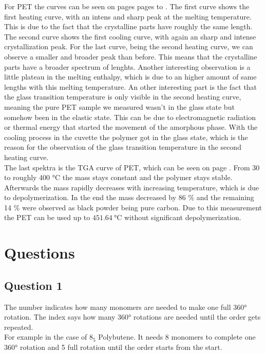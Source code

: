 \documentclass[10pt,a4paper,ngerman]{scrartcl}
\begin{document}
    For PET the curves can be seen on pages pages \pageref{pdf:pet-1hc} to \pageref{pdf:pet-2hc}. The first curve shows the first heating curve, with
    an intens and sharp peak at the melting temperature. This is due to the fact that the crystalline parts have roughly the same length.
    The second curve shows the first cooling curve, with again an sharp and intense crystallization peak. For the last curve, being the second 
    heating curve, we can observe a smaller and broader peak than before. This means that the crystalline parts have a broader spectrum of lenghts.
    Another interesting observation is a little plateau in the melting enthalpy, which is due to an higher amount of same lengths with this 
    melting temperature. 
    An other interesting part is the fact that the glass transition temperature is only visible in the second heating curve, meaning the pure PET 
    sample we measured wasn't in the glass state but somehow been in the elastic state. This can be due to electromagnetic radiation or thermal 
    energy that started the movement of the amorphous phase. With the cooling process in the cuvette the polymer got in the glass state, which is 
    the reason for the observation of the glass transition temperature in the second heating curve. \cite{polyskript}\\

    The last spektra is the TGA curve of PET, which can be seen on page \pageref{pdf:pet-tga}. From 30 to roughly 400 °C the mass stays constant 
    and the polymer stays stable. Afterwards the mass rapidly decreases with increasing temperature, which is due to depolymerization. In the end 
    the mass decreased by 86 \% and the remaining 14 \% were observed as black powder being pure carbon. Due to this measurement the PET can be 
    used up to $\SI{451.64}{\degreeCelsius}$ without significant depolymerization.






\section{Questions}

        \subsection{Question 1}

            The number indicates how many monomers are needed to make one full 360° rotation.
            The index says how many 360° rotations are needed until the order gets repeated.\\
            For example in the case of $8_5$ Polybutene. It needs 8 monomers to complete one 360° rotation and 5 full rotation until the order starts from the start.
\end{document}
